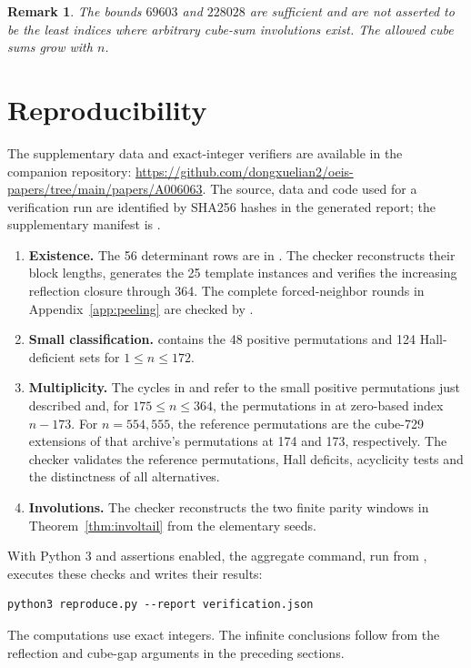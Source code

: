 \documentclass[9pt]{extarticle}
\newtheorem{remark}[theorem]{Remark}
\begin{document}
\begin{remark}
The bounds $69603$ and $228028$ are sufficient and are not asserted
to be the least indices where arbitrary cube-sum involutions exist.
The allowed cube sums grow with $n$.
\end{remark}

\section{Reproducibility}\label{sec:audit}
The supplementary data and exact-integer verifiers are available in the
companion repository:
\url{https://github.com/dongxuelian2/oeis-papers/tree/main/papers/A006063}.
The source, data and code used for a verification run are identified by
SHA256 hashes in the generated report; the supplementary manifest is
.

\begin{enumerate}[leftmargin=*,itemsep=3pt]
\item \textbf{Existence.} The 56 determinant rows are in
.
The checker  reconstructs their block lengths,
generates the 25 template instances and verifies the increasing reflection
closure through 364. The complete forced-neighbor rounds in
Appendix~\ref{app:peeling} are checked by .
\item \textbf{Small classification.}
 contains the
48 positive permutations and 124 Hall-deficient sets for $1\le n\le172$.
\item \textbf{Multiplicity.} The cycles in
 and
 refer to the small positive
permutations just described and, for $175\le n\le364$, the permutations in
 at zero-based index $n-173$.
For $n=554, 555$, the reference permutations are the cube-729 extensions
of that archive's permutations at 174 and 173, respectively.
The checker  validates the reference permutations,
Hall deficits, acyclicity tests and the distinctness of all alternatives.
\item \textbf{Involutions.} The checker
 reconstructs the two finite parity
windows in Theorem~\ref{thm:involtail} from the elementary seeds.
\end{enumerate}

With Python 3 and assertions enabled, the aggregate command, run from
, executes these checks and writes their results:
\begin{Verbatim}[fontsize=\small]
python3 reproduce.py --report verification.json
\end{Verbatim}
The computations use exact integers. The infinite conclusions follow from
the reflection and cube-gap arguments in the preceding sections.
\end{document}
